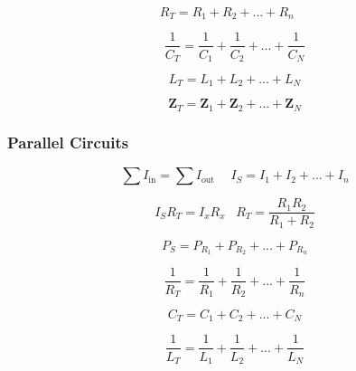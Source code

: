 \documentclass[twocolumn, 12pt]{article}
\begin{document}
{        \begin{equation*}
            R_{T}=R_1+R_2+...+R_n \hspace{15pt} 
        \end{equation*}
        
        \begin{equation*}
            \frac{1}{C_T}=\frac{1}{C_1}+\frac{1}{C_2}+...+\frac{1}{C_N}
        \end{equation*}
        
        \begin{equation*}
            L_T=L_1+L_2+...+L_N
        \end{equation*}
        
        \begin{equation*}
            \textbf{Z}_T = \textbf{Z}_1 + \textbf{Z}_2 +...+\textbf{Z}_N
        \end{equation*}
        
        
\subsubsection*{Parallel Circuits}
        
        \begin{equation*}
            \sum I_{\text{in}}= \sum I_{\text{out}} \hspace{15pt}  I_S=I_1+I_2+...+I_n               
        \end{equation*}
        
        \begin{equation*}
            I_S R_T=I_x R_x \hspace{10pt}   R_T=\frac{R_1R_2}{R_1+R_2} 
        \end{equation*}
        
        \begin{equation*}
            P_S=P_{R_1}+P_{R_2}+...+P_{R_n}
        \end{equation*}
        
        \begin{equation*}
            \frac{1}{R_T}=\frac{1}{R_1}+\frac{1}{R_2}+...+\frac{1}{R_n}
        \end{equation*}
        
        \begin{equation*}
            C_T=C_1+C_2+...+C_N
        \end{equation*}
        
        \begin{equation*}
            \frac{1}{L_T}=\frac{1}{L_1}+\frac{1}{L_2}+...+\frac{1}{L_N}
        \end{equation*}
        
}
\end{document}
